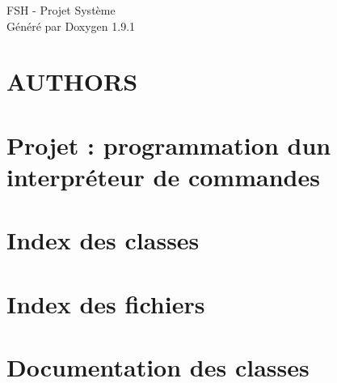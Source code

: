 \let\mypdfximage\pdfximage\def\pdfximage{\immediate\mypdfximage}\documentclass[twoside]{book}
\newcommand{\+}{\discretionary{\mbox{\scriptsize$\hookleftarrow$}}{}{}}
\newcommand{\clearemptydoublepage}{%
  \newpage{\pagestyle{empty}\cleardoublepage}%
}
\begin{document}
\raggedbottom

\hypersetup{pageanchor=false,
             bookmarksnumbered=true,
             pdfencoding=unicode
            }
\begin{titlepage}
\vspace*{7cm}
\begin{center}%
{\Large FSH -\/ Projet Système }\\
\vspace*{1cm}
{\large Généré par Doxygen 1.9.1}\\
\end{center}
\end{titlepage}
\clearemptydoublepage
{}
\tableofcontents
\clearemptydoublepage
{}
\hypersetup{pageanchor=true}

\chapter{AUTHORS}
\label{md_AUTHORS}

\chapter{Projet \+: programmation d\textquotesingle{}un interpréteur de commandes}
\label{md_projet}

\chapter{Index des classes}

\chapter{Index des fichiers}

\chapter{Documentation des classes}














\end{document}
